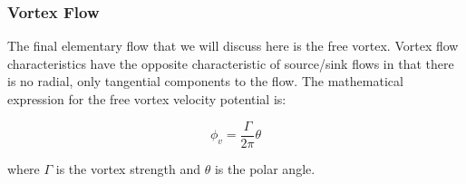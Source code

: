 

\subsubsection{Vortex Flow}

\begin{marginfigure}
    
\end{marginfigure}
The final elementary flow that we will discuss here is the free vortex.
%
Vortex flow characteristics have the opposite characteristic of source/sink flows in that there is no radial, only tangential components to the flow.
%
The mathematical expression for the free vortex velocity potential is:

\begin{equation}
    \label{eqn:vortexflow}
    \phi_v = \frac{\Gamma}{2\pi} \theta
\end{equation}

\noindent where \(\Gamma\) is the vortex strength and \(\theta\) is the polar angle.
